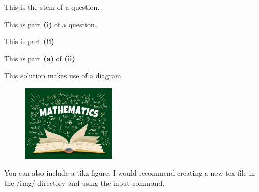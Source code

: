 

\begin{question}
    This is the stem of a question.

    \begin{questionparts}
        \item This is part \textbf{(i)} of a question. 
        \item This is part \textbf{(ii)} 
        \begin{questionsubparts}
            \item This is part \textbf{(a)} of \textbf{(ii)}
        \end{questionsubparts}
    \end{questionparts}

\end{question}

\begin{solution}
    This solution makes use of a diagram. 

    \begin{figure}[!ht]
        \centering
        \includegraphics[width=0.4\textwidth]{img/example.jpeg}
    \end{figure}

    You can also include a tikz figure. I would recommend creating a new tex file in the /img/ directory and using the input command. 
\end{solution}